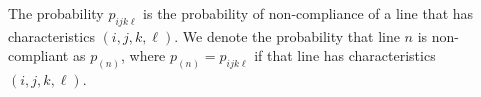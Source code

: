 \documentclass{article}
\begin{document}
The probability $p_{ijk\ell}$ is the probability of non-compliance of a line that has characteristics $(i,j,k,\ell)$. We denote the probability that line $n$ is non-compliant as $p_{(n)}$, where $p_{(n)} = p_{ijk\ell}$ if that line has characteristics $(i,j,k,\ell)$.

%
%
%
\end{document}
